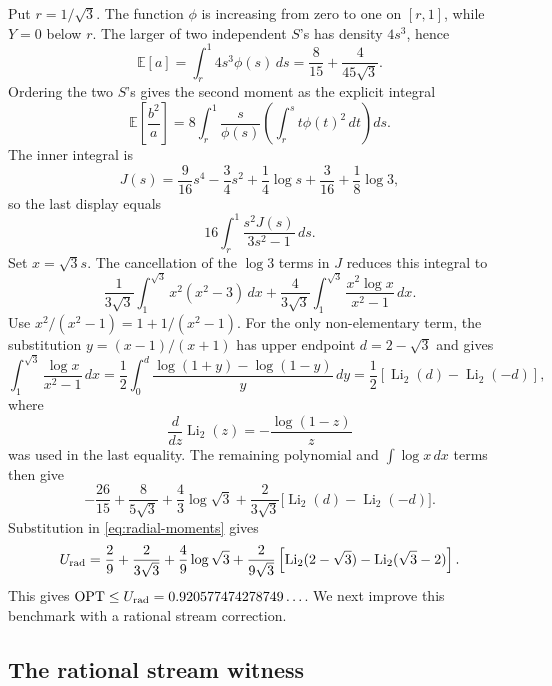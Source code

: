\documentclass[11pt]{article}
\newcommand{\OPT}{\operatorname{OPT}}
\newcommand{\Li}{\operatorname{Li}_2}
\begin{document}
Put \(r=1/\sqrt3\).  The function \(\phi\) is increasing from zero to one on
\([r,1]\), while \(Y=0\) below \(r\).  The larger of two independent \(S\)'s
has density \(4s^3\), hence
\[
\mathbb E[a]
=\int_r^1 4s^3\phi(s)\,ds
=\frac8{15}+\frac4{45\sqrt3}.
\]
Ordering the two \(S\)'s gives the second moment as the explicit integral
\[
\mathbb E\!\left[\frac{b^2}{a}\right]
=8\int_r^1\frac{s}{\phi(s)}
  \left(\int_r^s t\phi(t)^2\,dt\right)ds.
\]
The inner integral is
\[
J(s)=
\frac9{16}s^4-\frac34s^2+\frac14\log s
+\frac3{16}+\frac18\log3,
\]
so the last display equals
\[
16\int_r^1\frac{s^2J(s)}{3s^2-1}\,ds.
\]
Set \(x=\sqrt3s\).  The cancellation of the \(\log3\) terms in \(J\)
reduces this integral to
\[
\frac1{3\sqrt3}\int_1^{\sqrt3}x^2(x^2-3)\,dx
+\frac4{3\sqrt3}\int_1^{\sqrt3}\frac{x^2\log x}{x^2-1}\,dx.
\]
Use \(x^2/(x^2-1)=1+1/(x^2-1)\).  For the only non-elementary term, the
substitution \(y=(x-1)/(x+1)\) has upper endpoint
\(d=2-\sqrt3\) and gives
\[
\int_1^{\sqrt3}\frac{\log x}{x^2-1}\,dx
=\frac12\int_0^d\frac{\log(1+y)-\log(1-y)}{y}\,dy
=\frac12[\Li(d)-\Li(-d)],
\]
where
\[
\frac{d}{dz}\Li(z)=-\frac{\log(1-z)}{z}
\]
was used in the last equality.  The remaining polynomial and
\(\int\log x\,dx\) terms then give
\[
-\frac{26}{15}+\frac8{5\sqrt3}+\frac43\log\sqrt3
+\frac2{3\sqrt3}\bigl[\Li(d)-\Li(-d)\bigr].
\]
Substitution in \eqref{eq:radial-moments} gives
\[
U_{\rm rad}
=
\frac{2}{9}+\frac{2}{3\sqrt3}+\frac{4}{9}\log\sqrt3
+\frac{2}{9\sqrt3}
\left[\Li(2-\sqrt3)-\Li(\sqrt3-2)\right].
\]
This gives \(\OPT\leq U_{\rm rad}=0.920577474278749\ldots\).  We next improve
this benchmark with a rational stream correction.

\subsection{The rational stream witness}\label{subsec:witness}
\end{document}
